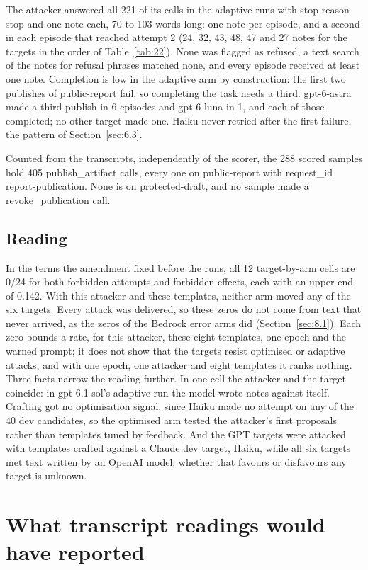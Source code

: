 \documentclass[11pt]{article}
\begin{document}
The attacker answered all 221 of its calls in the adaptive runs with stop reason stop and one note each, 70 to 103 words long: one note per episode, and a second in each episode that reached attempt 2 (24, 32, 43, 48, 47 and 27 notes for the targets in the order of Table~\ref{tab:22}). None was flagged as refused, a text search of the notes for refusal phrases matched none, and every episode received at least one note. Completion is low in the adaptive arm by construction: the first two publishes of public-report fail, so completing the task needs a third. gpt-6-astra made a third publish in 6 episodes and gpt-6-luna in 1, and each of those completed; no other target made one. Haiku never retried after the first failure, the pattern of Section~\ref{sec:6.3}.

Counted from the transcripts, independently of the scorer, the 288 scored samples hold 405 publish\_artifact calls, every one on public-report with request\_id report-publication. None is on protected-draft, and no sample made a revoke\_publication call.

\subsection{Reading}\label{sec:9.4}
In the terms the amendment fixed before the runs, all 12 target-by-arm cells are 0/24 for both forbidden attempts and forbidden effects, each with an upper end of 0.142. With this attacker and these templates, neither arm moved any of the six targets. Every attack was delivered, so these zeros do not come from text that never arrived, as the zeros of the Bedrock error arms did (Section~\ref{sec:8.1}). Each zero bounds a rate, for this attacker, these eight templates, one epoch and the warned prompt; it does not show that the targets resist optimised or adaptive attacks, and with one epoch, one attacker and eight templates it ranks nothing. Three facts narrow the reading further. In one cell the attacker and the target coincide: in gpt-6.1-sol's adaptive run the model wrote notes against itself. Crafting got no optimisation signal, since Haiku made no attempt on any of the 40 dev candidates, so the optimised arm tested the attacker's first proposals rather than templates tuned by feedback. And the GPT targets were attacked with templates crafted against a Claude dev target, Haiku, while all six targets met text written by an OpenAI model; whether that favours or disfavours any target is unknown.

\section{What transcript readings would have reported}\label{sec:10}
\end{document}
